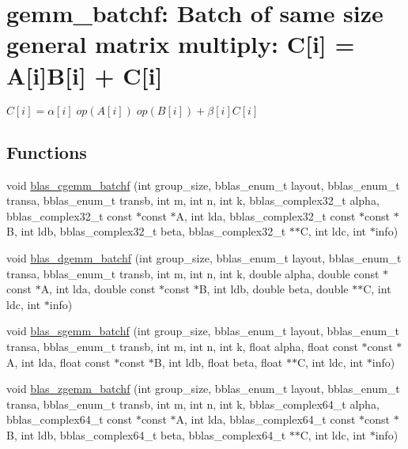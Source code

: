 \hypertarget{group__gemm__batchf}{}\section{gemm\+\_\+batchf\+: Batch of same size general matrix multiply\+: C\mbox{[}i\mbox{]} = A\mbox{[}i\mbox{]}B\mbox{[}i\mbox{]} + C\mbox{[}i\mbox{]}}
\label{group__gemm__batchf}


$ C[i] = \alpha[i] \;op(A[i]) \;op(B[i]) + \beta[i] C[i] $  


\subsection*{Functions}
\begin{DoxyCompactItemize}
\item 
void \hyperlink{group__gemm__batchf_ga7638ee53c76c8e1b40dffa9574f5cbad}{blas\+\_\+cgemm\+\_\+batchf} (int group\+\_\+size, bblas\+\_\+enum\+\_\+t layout, bblas\+\_\+enum\+\_\+t transa, bblas\+\_\+enum\+\_\+t transb, int m, int n, int k, bblas\+\_\+complex32\+\_\+t alpha, bblas\+\_\+complex32\+\_\+t const $\ast$const $\ast$A, int lda, bblas\+\_\+complex32\+\_\+t const $\ast$const $\ast$B, int ldb, bblas\+\_\+complex32\+\_\+t beta, bblas\+\_\+complex32\+\_\+t $\ast$$\ast$C, int ldc, int $\ast$info)
\item 
void \hyperlink{group__gemm__batchf_gaa3c403cc8465c276b39d139275e5c0bd}{blas\+\_\+dgemm\+\_\+batchf} (int group\+\_\+size, bblas\+\_\+enum\+\_\+t layout, bblas\+\_\+enum\+\_\+t transa, bblas\+\_\+enum\+\_\+t transb, int m, int n, int k, double alpha, double const $\ast$const $\ast$A, int lda, double const $\ast$const $\ast$B, int ldb, double beta, double $\ast$$\ast$C, int ldc, int $\ast$info)
\item 
void \hyperlink{group__gemm__batchf_ga5b47cbf645948cf526faafecdd56ff35}{blas\+\_\+sgemm\+\_\+batchf} (int group\+\_\+size, bblas\+\_\+enum\+\_\+t layout, bblas\+\_\+enum\+\_\+t transa, bblas\+\_\+enum\+\_\+t transb, int m, int n, int k, float alpha, float const $\ast$const $\ast$A, int lda, float const $\ast$const $\ast$B, int ldb, float beta, float $\ast$$\ast$C, int ldc, int $\ast$info)
\item 
void \hyperlink{group__gemm__batchf_ga2b91753e96ae9bd05c75ebedd35cfce8}{blas\+\_\+zgemm\+\_\+batchf} (int group\+\_\+size, bblas\+\_\+enum\+\_\+t layout, bblas\+\_\+enum\+\_\+t transa, bblas\+\_\+enum\+\_\+t transb, int m, int n, int k, bblas\+\_\+complex64\+\_\+t alpha, bblas\+\_\+complex64\+\_\+t const $\ast$const $\ast$A, int lda, bblas\+\_\+complex64\+\_\+t const $\ast$const $\ast$B, int ldb, bblas\+\_\+complex64\+\_\+t beta, bblas\+\_\+complex64\+\_\+t $\ast$$\ast$C, int ldc, int $\ast$info)
\end{DoxyCompactItemize}



